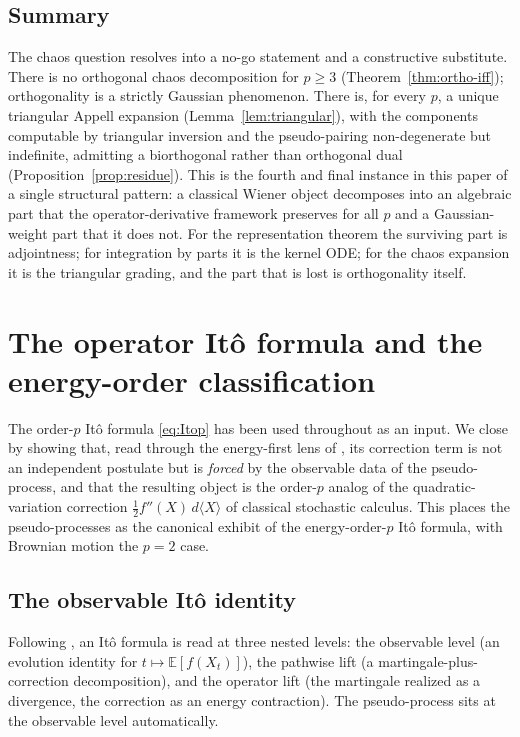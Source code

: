 \documentclass[11pt,reqno]{amsart}
\theoremstyle{plain}
\theoremstyle{definition}
\newcommand{\E}{\mathbb{E}}
\begin{document}
\subsection{Summary}

The chaos question resolves into a no-go statement and a constructive substitute. There is no orthogonal chaos decomposition for $p \geq 3$ (Theorem~\ref{thm:ortho-iff}); orthogonality is a strictly Gaussian phenomenon. There is, for every $p$, a unique triangular Appell expansion (Lemma~\ref{lem:triangular}), with the components computable by triangular inversion and the pseudo-pairing non-degenerate but indefinite, admitting a biorthogonal rather than orthogonal dual (Proposition~\ref{prop:residue}). This is the fourth and final instance in this paper of a single structural pattern: a classical Wiener object decomposes into an algebraic part that the operator-derivative framework preserves for all $p$ and a Gaussian-weight part that it does not. For the representation theorem the surviving part is adjointness; for integration by parts it is the kernel ODE; for the chaos expansion it is the triangular grading, and the part that is lost is orthogonality itself.

\section{The operator It\^o formula and the energy-order classification}
\label{sec:ito}

The order-$p$ It\^o formula \eqref{eq:Itop} has been used throughout as an input. We close by showing that, read through the energy-first lens of \cite{operatorDerivativeI}, its correction term is not an independent postulate but is \emph{forced} by the observable data of the pseudo-process, and that the resulting object is the order-$p$ analog of the quadratic-variation correction $\tfrac12 f''(X)\,d\langle X\rangle$ of classical stochastic calculus. This places the pseudo-processes as the canonical exhibit of the energy-order-$p$ It\^o formula, with Brownian motion the $p=2$ case.

\subsection{The observable It\^o identity}

Following \cite[\S 1]{operatorDerivativeI}, an It\^o formula is read at three nested levels: the observable level (an evolution identity for $t \mapsto \E[f(X_t)]$), the pathwise lift (a martingale-plus-correction decomposition), and the operator lift (the martingale realized as a divergence, the correction as an energy contraction). The pseudo-process sits at the observable level automatically.
\end{document}
